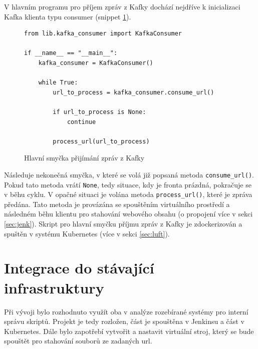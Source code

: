 \documentclass[thesis=M,czech,hidelinks]{FITthesis}[2013/05/06]
\begin{document}
V hlavním programu pro příjem zpráv z Kafky dochází nejdříve k inicializaci Kafka klienta typu consumer (snippet \ref{snip:kafkamain consum}).
\begin{figure}[h]               
	\begin{verbatim}
from lib.kafka_consumer import KafkaConsumer

if __name__ == "__main__":
    kafka_consumer = KafkaConsumer()
    
    while True:
        url_to_process = kafka_consumer.consume_url()

        if url_to_process is None:
            continue
        
        process_url(url_to_process)
	\end{verbatim}      
	\caption{Hlavní smyčka přijímání zpráv z Kafky}
	\label{snip:kafkamain consum}
\end{figure}
Následuje nekonečná smyčka, v které se volá již popsaná metoda \texttt{consume_url()}. Pokud tato metoda vrátí \texttt{None}, tedy situace, kdy je fronta prázdná, pokračuje se v běhu cyklu. V opačné situaci je volána metoda \texttt{process_url()}, které je zpráva předána. Tato metoda je provázána se spouštěním virtuálního prostředí a následném běhu klientu pro stahování webového obsahu (o propojení více v sekci \ref{sec:jenk}).  Skript pro hlavní smyčku příjmu zpráv z Kafky je zdockerizován a spuštěn v systému Kubernetes (více v sekci \ref{sec:luft}). 





\section{Integrace do stávající infrastruktury} \label{sec:integrace}
Při vývoji bylo rozhodnuto využít oba v analýze rozebírané systémy pro interní správu skriptů. Projekt je tedy rozložen, část je spouštěna v Jenkinsu a část v Kubernetes. Dále bylo zapotřebí vytvořit a nastavit virtuální stroj, který se bude spouštět pro stahování souborů ze zadaných url.
\end{document}
